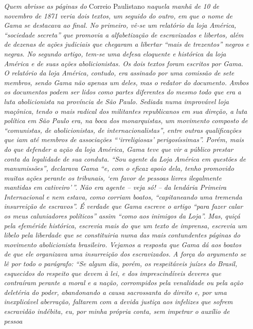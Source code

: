 {\begin{argumento}
\emph{Quem abrisse as páginas do} Correio Paulistano \emph{naquela manhã
de 10 de novembro de 1871 veria dois textos, um seguido do outro, em que
o nome de Gama se destacava ao final. No primeiro, vê-se um relatório da
loja América, ``sociedade secreta'' que promovia a alfabetização de
escravizados e libertos, além de dezenas de ações judiciais que chegaram
a libertar ``mais de trezentos'' negros e negras. No segundo artigo,
tem-se uma defesa eloquente e histórica da loja América e de suas ações
abolicionistas. Os dois textos foram escritos por Gama. O relatório da
loja América, contudo, era assinado por uma comissão de sete membros,
sendo Gama não apenas um deles, mas o redator do documento. Ambos os
documentos podem ser lidos como partes diferentes do mesmo todo que era
a luta abolicionista na província de São Paulo. Sediada numa improvável
loja maçônica, tendo o mais radical dos militantes republicanos em sua
direção, a luta política em São Paulo era, na boca dos monarquistas, um
movimento composto de ``comunistas, de abolicionistas, de
internacionalistas'', entre outras qualificações que iam até membros de
associações ```irreligiosas' perigosíssimas''. Porém, mais do que defender
a ação da loja América, Gama teve que vir a público prestar conta da
legalidade de sua conduta. ``Sou agente da Loja América em questões de
manumissões'', declarava Gama ``e, com o eficaz apoio dela, tenho
promovido muitas ações perante os tribunais, `em favor de pessoas livres
ilegalmente mantidas em cativeiro'\,''. Não era agente -- veja só! -- da
lendária Primeira Internacional e nem estava, como corriam boatos,
``capitaneando uma tremenda insurreição de escravos''. É verdade que Gama
escreve o artigo ``para fazer calar os meus caluniadores políticos'' assim
``como aos inimigos da Loja''. Mas, quiçá pela efeméride histórica,
escrevia mais do que um texto de imprensa, escrevia um libelo pela
liberdade que se constituiria numa das mais contundentes páginas do
movimento abolicionista brasileiro. Vejamos a resposta que Gama dá aos
boatos de que ele organizava uma insurreição dos escravizados. A força
do argumento se lê por todo o parágrafo: ``Se algum dia, porém, os
respeitáveis juízes do Brasil, esquecidos do respeito que devem à lei, e
dos imprescindíveis deveres que contraíram perante a moral e a nação,
corrompidos pela venalidade ou pela ação deletéria do poder, abandonando
a causa sacrossanta do direito e, por uma inexplicável aberração,
faltarem com a devida justiça aos infelizes que sofrem escravidão
indébita, eu, por minha própria conta, sem impetrar o auxílio de pessoa
}
\end{argumento}}
